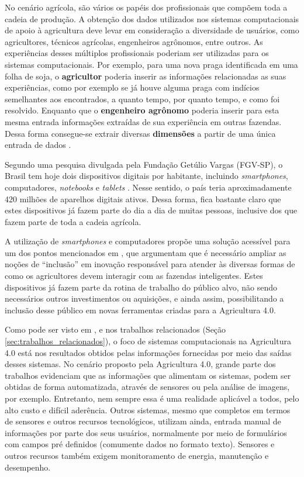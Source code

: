\documentclass[12pt]{article}
\begin{document}
No cenário agrícola, são vários os papéis dos profissionais que compõem toda a cadeia de produção. A obtenção dos dados utilizados nos sistemas computacionais de apoio à agricultura deve levar em consideração a diversidade de usuários, como agricultores, técnicos agrícolas, engenheiros agrônomos, entre outros. As experiências desses múltiplos profissionais poderiam ser utilizadas para os sistemas computacionais. Por exemplo, para uma nova praga identificada em uma folha de soja, o \textbf{agricultor} poderia inserir as informações relacionadas as suas experiências, como por exemplo se já houve alguma praga com indícios semelhantes aos encontrados, a quanto tempo, por quanto tempo, e como foi resolvido. Enquanto que o \textbf{engenheiro agrônomo} poderia inserir para esta mesma entrada informações extraídas de sua experiência em outras fazendas. Dessa forma consegue-se extrair diversas \textbf{dimensões} a partir de uma única entrada de dados \cite{Walling:2020}.

Segundo uma pesquisa divulgada pela Fundação Getúlio Vargas (FGV-SP), o Brasil tem hoje dois dispositivos digitais por habitante, incluindo \textit{smartphones}, computadores, \textit{notebooks} e \textit{tablets} \cite{FGV:2020}. Nesse sentido, o país teria aproximadamente 420 milhões de aparelhos digitais ativos. Dessa forma, fica bastante claro que estes dispositivos já fazem parte do dia a dia de muitas pessoas, inclusive dos que fazem parte de toda a cadeia agrícola.

A utilização de \textit{smartphones} e computadores propõe uma solução acessível para um dos pontos mencionados em , que argumentam que é necessário ampliar as noções de ``inclusão'' em inovação responsável para atender às diversas formas de como os agricultores devem interagir com as fazendas inteligentes. Estes dispositivos já fazem parte da rotina de trabalho do público alvo, não sendo necessários outros investimentos ou aquisições, e ainda assim, possibilitando a inclusão desse público em novas ferramentas criadas para a Agricultura 4.0.

Como pode ser visto em , e nos trabalhos relacionados (Seção \ref{sec:trabalhos_relacionados}), o foco de sistemas computacionais na Agricultura 4.0 está nos resultados obtidos pelas informações fornecidas por meio das saídas desses sistemas. No cenário proposto pela Agricultura 4.0, grande parte dos trabalhos evidenciam que as informações que alimentam os sistemas, podem ser obtidas de forma automatizada, através de sensores ou pela análise de imagens, por exemplo. Entretanto, nem sempre essa é uma realidade aplicável a todos, pelo alto custo e difícil aderência. Outros sistemas, mesmo que completos em termos de sensores e outros recursos tecnológicos, utilizam ainda, entrada manual de informações por parte dos seus usuários, normalmente por meio de formulários com campos pré definidos (comumente dados no formato texto). Sensores e outros recursos também exigem monitoramento de energia, manutenção e desempenho.
\end{document}
